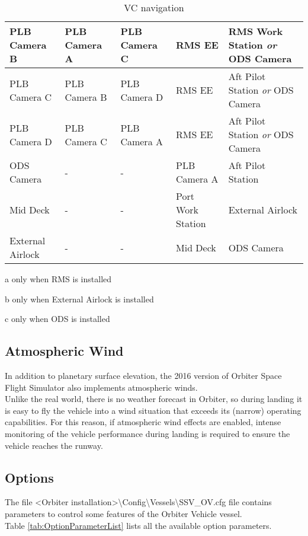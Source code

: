 \documentclass[Space_Shuttle_Vessel_Manual.tex]{subfiles}
\begin{document}
\begin{table}[H]
\begin{threeparttable}
\begin{tabular}{l|p{2.88cm} p{2.88cm} p{2.88cm} p{2.88cm} }
	\hline\rule{0pt}{2ex}
	PLB Camera B & PLB Camera A & PLB Camera C & RMS EE\tnote{a,c} & RMS Work Station \textit{or} ODS Camera\tnote{c}\\
	\hline\rule{0pt}{2ex}
	PLB Camera C & PLB Camera B & PLB Camera D & RMS EE\tnote{a,c} & Aft Pilot Station \textit{or} ODS Camera\tnote{c}\\
	\hline\rule{0pt}{2ex}
	PLB Camera D & PLB Camera C & PLB Camera A & RMS EE\tnote{a,c} & Aft Pilot Station \textit{or} ODS Camera\tnote{c}\\
	\hline\rule{0pt}{2ex}
	ODS Camera\tnote{c} & - & - & PLB Camera A & Aft Pilot Station\\
	\hline\rule{0pt}{2ex}
	Mid Deck & - & - & Port Work Station & External Airlock\tnote{b}\\
	\hline\rule{0pt}{2ex}
	External Airlock\tnote{b} & - & - & Mid Deck & ODS Camera\tnote{c}\\
  \end{tabular}
	\begin{tablenotes}
		\item[a] only when RMS is installed
		\item[b] only when External Airlock is installed
		\item[c] only when ODS is installed
	\end{tablenotes}
	\end{threeparttable}
  \caption{VC navigation}
  \label{tab:VC_navigation}
\end{table}


\begin{multicols*}{2}
\subsection{Atmospheric Wind}
In addition to planetary surface elevation, the 2016 version of Orbiter Space Flight Simulator also implements atmospheric winds.\\
Unlike the real world, there is no weather forecast in Orbiter, so during landing it is easy to fly the vehicle into a wind situation that exceeds its (narrow) operating capabilities. For this reason, if atmospheric wind effects are enabled, intense monitoring of the vehicle performance during landing is required to ensure the vehicle reaches the runway.\\


\subsection{Options}
The file <Orbiter installation>\textbackslash Config\textbackslash Vessels\textbackslash SSV\_OV.cfg file contains parameters to control some features of the Orbiter Vehicle vessel.\\
Table \ref{tab:OptionParameterList} lists all the available option parameters.

\end{multicols*}
\end{document}
